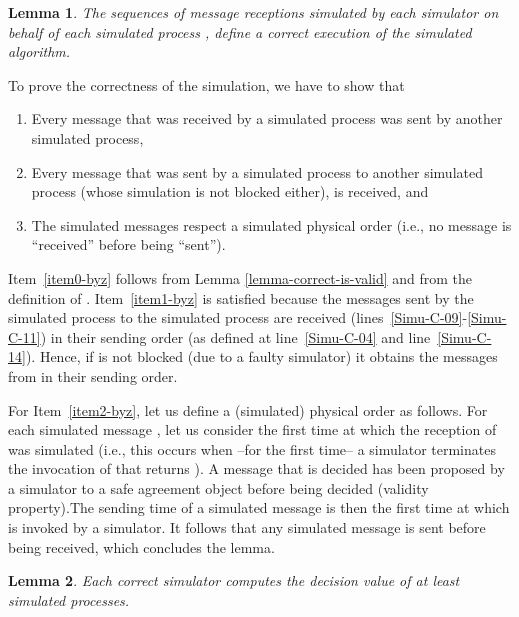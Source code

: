 \documentclass[11pt,letterpaper]{article}
\newtheorem{lemma}{Lemma}
\newlength {\afterproof}
\newcommand{\toto}{xxx}
\newenvironment{proofL}{\noindent{\bf Proof }}
{\hspace*{\fill}\par\vspace{\afterproof}}
\begin{document}
\begin{lemma}
\label{lemma:correct-simulation-byz}
The sequences of message receptions simulated by each simulator 
on behalf of each simulated process , define a correct execution of
the simulated algorithm.
\end{lemma}

\begin{proofL}
To prove the correctness of the simulation, we have  to show that
\begin{enumerate}
\vspace{-0.2cm}
\item
\label{item0-byz}
Every message that was received by a simulated process was sent
 by another simulated process,
\vspace{-0.2cm}
\item
\label{item1-byz}
Every message that was sent by a simulated process to another simulated
process (whose simulation is not blocked either), is received, and
\vspace{-0.2cm}
\item
\label{item2-byz}
The simulated messages respect a simulated physical order
(i.e., no message is ``received'' before being  ``sent'').
\end{enumerate}

Item~\ref{item0-byz} follows from Lemma \ref{lemma-correct-is-valid}
 and from the definition of .
Item~\ref{item1-byz} is satisfied because the messages sent by
the simulated process  to the simulated process  are received
(lines~\ref{Simu-C-09}-\ref{Simu-C-11}) in their sending order
(as defined at line~\ref{Simu-C-04}  and line~\ref{Simu-C-14}).
Hence, if  is not blocked (due to a faulty simulator)
it obtains the messages from  in their sending order.


For Item~\ref{item2-byz}, let us define a (simulated) physical order as follows.
For each simulated message , let us consider the first time at which the
reception of   was simulated (i.e., this occurs when
 --for the first time-- a simulator terminates  the invocation  of
  that returns ).
A message that is decided has been proposed by a simulator to a safe agreement
object before  being decided (validity property).The sending time  of a
simulated message is then the first time at which
 is  invoked by a simulator.
It follows that any simulated  message is sent before being received,
which concludes the lemma.
\renewcommand{\toto}{lemma:correct-simulation-byz}
\end{proofL}


\begin{lemma}
\label{lemma:nb-simulated-proc-byz}
Each correct simulator  computes the decision value of
at least  simulated processes.
\end{lemma}
\end{document}
